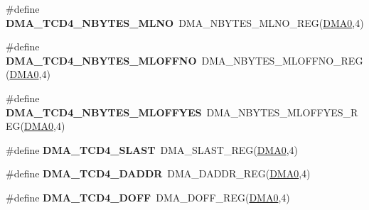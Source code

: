 \begin{DoxyCompactItemize}
\item 
\#define {\bfseries D\+M\+A\+\_\+\+T\+C\+D4\+\_\+\+N\+B\+Y\+T\+E\+S\+\_\+\+M\+L\+NO}~D\+M\+A\+\_\+\+N\+B\+Y\+T\+E\+S\+\_\+\+M\+L\+N\+O\+\_\+\+R\+EG(\hyperlink{group__DMA__Peripheral__Access__Layer_ga4103044f9ca209772f513dc694513ffb}{D\+M\+A0},4)\hypertarget{group__DMA__Register__Accessor__Macros_ga15f1f1198c82e029336d290baffd758a}{}\label{group__DMA__Register__Accessor__Macros_ga15f1f1198c82e029336d290baffd758a}

\item 
\#define {\bfseries D\+M\+A\+\_\+\+T\+C\+D4\+\_\+\+N\+B\+Y\+T\+E\+S\+\_\+\+M\+L\+O\+F\+F\+NO}~D\+M\+A\+\_\+\+N\+B\+Y\+T\+E\+S\+\_\+\+M\+L\+O\+F\+F\+N\+O\+\_\+\+R\+EG(\hyperlink{group__DMA__Peripheral__Access__Layer_ga4103044f9ca209772f513dc694513ffb}{D\+M\+A0},4)\hypertarget{group__DMA__Register__Accessor__Macros_ga6366797b418a1074278f15243b4ef66c}{}\label{group__DMA__Register__Accessor__Macros_ga6366797b418a1074278f15243b4ef66c}

\item 
\#define {\bfseries D\+M\+A\+\_\+\+T\+C\+D4\+\_\+\+N\+B\+Y\+T\+E\+S\+\_\+\+M\+L\+O\+F\+F\+Y\+ES}~D\+M\+A\+\_\+\+N\+B\+Y\+T\+E\+S\+\_\+\+M\+L\+O\+F\+F\+Y\+E\+S\+\_\+\+R\+EG(\hyperlink{group__DMA__Peripheral__Access__Layer_ga4103044f9ca209772f513dc694513ffb}{D\+M\+A0},4)\hypertarget{group__DMA__Register__Accessor__Macros_gaf819508a4a70a0d564efc5f86e92ce3e}{}\label{group__DMA__Register__Accessor__Macros_gaf819508a4a70a0d564efc5f86e92ce3e}

\item 
\#define {\bfseries D\+M\+A\+\_\+\+T\+C\+D4\+\_\+\+S\+L\+A\+ST}~D\+M\+A\+\_\+\+S\+L\+A\+S\+T\+\_\+\+R\+EG(\hyperlink{group__DMA__Peripheral__Access__Layer_ga4103044f9ca209772f513dc694513ffb}{D\+M\+A0},4)\hypertarget{group__DMA__Register__Accessor__Macros_gac9552b10b44987816c32f2122c2f6dc7}{}\label{group__DMA__Register__Accessor__Macros_gac9552b10b44987816c32f2122c2f6dc7}

\item 
\#define {\bfseries D\+M\+A\+\_\+\+T\+C\+D4\+\_\+\+D\+A\+D\+DR}~D\+M\+A\+\_\+\+D\+A\+D\+D\+R\+\_\+\+R\+EG(\hyperlink{group__DMA__Peripheral__Access__Layer_ga4103044f9ca209772f513dc694513ffb}{D\+M\+A0},4)\hypertarget{group__DMA__Register__Accessor__Macros_gad344471a51f038a6669dbb0d31f8406c}{}\label{group__DMA__Register__Accessor__Macros_gad344471a51f038a6669dbb0d31f8406c}

\item 
\#define {\bfseries D\+M\+A\+\_\+\+T\+C\+D4\+\_\+\+D\+O\+FF}~D\+M\+A\+\_\+\+D\+O\+F\+F\+\_\+\+R\+EG(\hyperlink{group__DMA__Peripheral__Access__Layer_ga4103044f9ca209772f513dc694513ffb}{D\+M\+A0},4)\hypertarget{group__DMA__Register__Accessor__Macros_gace552f45c71998efe2fe0ae26939f548}{}\label{group__DMA__Register__Accessor__Macros_gace552f45c71998efe2fe0ae26939f548}


\end{DoxyCompactItemize}
